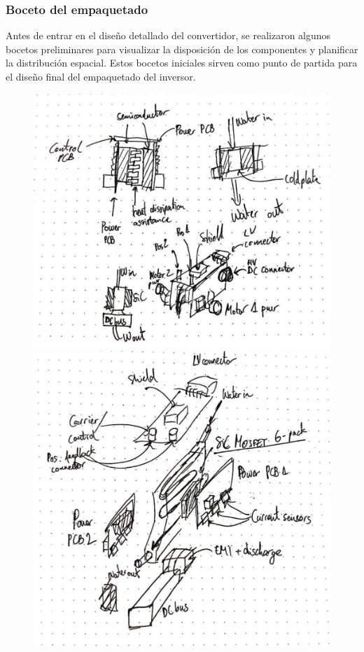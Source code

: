 \subsubsection{Boceto del empaquetado}

Antes de entrar en el diseño detallado del convertidor, se realizaron algunos bocetos preliminares para visualizar la disposición de los componentes y planificar la distribución espacial. Estos bocetos iniciales sirven como punto de partida para el diseño final del empaquetado del inversor.

\begin{figure}[H]
	\centering
	\begin{minipage}{0.45\textwidth}
		\centering
		\includegraphics[width=\textwidth]{fig/boceto1.jpg}
	\end{minipage}\hfill
	\begin{minipage}{0.45\textwidth}
		\centering
		\includegraphics[width=\textwidth]{fig/boceto2.jpg}

\end{minipage}
\end{figure}
